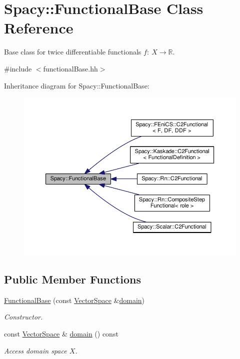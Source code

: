 \hypertarget{classSpacy_1_1FunctionalBase}{}\section{Spacy\+:\+:Functional\+Base Class Reference}
\label{classSpacy_1_1FunctionalBase}


Base class for twice differentiable functionals $ f:\ X\rightarrow \mathbb{R}$.  




{\ttfamily \#include $<$functional\+Base.\+hh$>$}



Inheritance diagram for Spacy\+:\+:Functional\+Base\+:
\nopagebreak
\begin{figure}[H]
\begin{center}
\leavevmode
\includegraphics[width=350pt]{classSpacy_1_1FunctionalBase__inherit__graph}
\end{center}
\end{figure}
\subsection*{Public Member Functions}
\begin{DoxyCompactItemize}
\item 
\hyperlink{classSpacy_1_1FunctionalBase_aa655b0f2b96f02a3137dad89e3f0d2ac}{Functional\+Base} (const \hyperlink{classSpacy_1_1VectorSpace}{Vector\+Space} \&\hyperlink{classSpacy_1_1FunctionalBase_a2d3397deb9fa1ad85ed04e37a03b3aa6}{domain})
\begin{DoxyCompactList}\small\item\em Constructor. \end{DoxyCompactList}\item 
const \hyperlink{classSpacy_1_1VectorSpace}{Vector\+Space} \& \hyperlink{classSpacy_1_1FunctionalBase_a2d3397deb9fa1ad85ed04e37a03b3aa6}{domain} () const \hypertarget{classSpacy_1_1FunctionalBase_a2d3397deb9fa1ad85ed04e37a03b3aa6}{}\label{classSpacy_1_1FunctionalBase_a2d3397deb9fa1ad85ed04e37a03b3aa6}

\begin{DoxyCompactList}\small\item\em Access domain space $X$. \end{DoxyCompactList}\end{DoxyCompactItemize}


